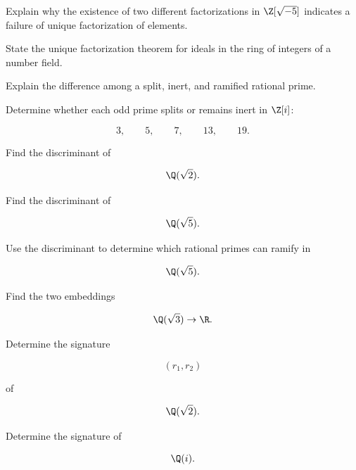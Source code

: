 \begin{exercise}[3]
Explain why the existence of two different factorizations in
\(\Z[\sqrt{-5}]\) indicates a failure of unique factorization of elements.
\end{exercise}

\begin{exercise}[2]
State the unique factorization theorem for ideals in the ring of integers of
a number field.
\end{exercise}

\begin{exercise}[2]
Explain the difference among a split, inert, and ramified rational prime.
\end{exercise}

\begin{exercise}[1]
Determine whether each odd prime splits or remains inert in \(\Z[i]\):

\[ 3,\qquad5,\qquad7,\qquad13,\qquad19. \]
\end{exercise}

\begin{exercise}[2]
Find the discriminant of

\[ \Q(\sqrt2). \]
\end{exercise}

\begin{exercise}[2]
Find the discriminant of

\[ \Q(\sqrt5). \]
\end{exercise}

\begin{exercise}[2]
Use the discriminant to determine which rational primes can ramify in

\[ \Q(\sqrt5). \]
\end{exercise}

\begin{exercise}[2]
Find the two embeddings

\[ \Q(\sqrt3)\to\R. \]
\end{exercise}

\begin{exercise}[2]
Determine the signature

\[ (r_1,r_2) \]

of

\[ \Q(\sqrt2). \]
\end{exercise}

\begin{exercise}[2]
Determine the signature of

\[ \Q(i). \]
\end{exercise}

